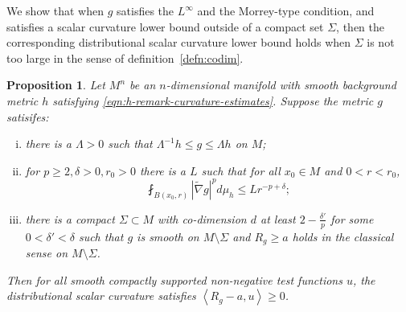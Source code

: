 \documentclass[12pt]{amsart}
\theoremstyle{plain}
\theoremstyle{plain}
\newtheorem{proposition}[subsection]{Proposition}
\theoremstyle{definition}
\theoremstyle{remark}
\numberwithin{equation}{subsection}
\newcommand{\hdel}{\tilde{\nabla}}
\begin{document}
We show that when $g$ satisfies the $L^\infty$ and the Morrey-type condition, and satisfies a scalar curvature lower bound outside of a compact set $\Sigma$, then the corresponding distributional scalar curvature lower bound holds when $\Sigma$ is not too large in the sense of definition~\ref{defn:codim}.

\begin{proposition}
\label{prop:distributional-scalar-curvature}
    Let $M^n$ be an $n$-dimensional manifold with smooth background metric $h$ satisfying \eqref{eqn:h-remark-curvature-estimates}. Suppose the metric $g$ satisifes:
    \begin{enumerate}[(i)]
        \item there is a $\Lambda > 0$ such that $\Lambda^{-1}h \leq g \leq \Lambda h$ on $M$;
        \item for $p \geq 2, \delta > 0, r_0 > 0$ there is a $L$ such that for all $x_0 \in M$ and $0 < r < r_0$,
        \begin{equation}
            \fint_{B(x_0, r)} |\hdel g|^p d\mu_h \leq L r^{-p + \delta};
        \end{equation}
        \item there is a compact $\Sigma \subset M$ with co-dimension $d$ at least $2 - \frac{\delta'}{p}$ for some $0<\delta'<\delta$ such that $g$ is smooth on $M \setminus \Sigma$ and $R_g \geq a$ holds in the classical sense on $M \setminus \Sigma$.
    \end{enumerate}
    Then for all smooth compactly supported non-negative test functions $u$, the distributional scalar curvature satisfies $\left\langle R_g - a, u \right\rangle \geq 0$.
\end{proposition}
\end{document}

